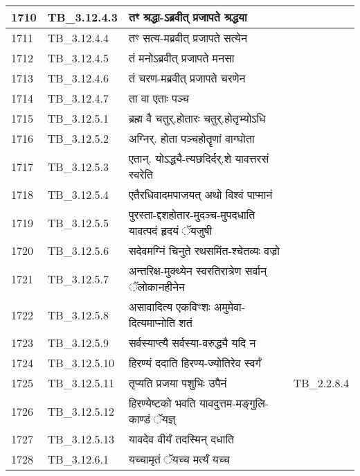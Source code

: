\documentclass[17pt]{extarticle}
\begin{document}
\begin{longtable}{||p{0.4in}||p{0.9in}||p{4.0in}||p{0.9in}||}
        \hline
            1710 & TB\_3.12.4.3 & तꣳ श्रद्धा{-}ऽब्रवीत् प्रजापते श्रद्धया &      \\
        \hline
            1711 & TB\_3.12.4.4 & तꣳ सत्य{-}मब्रवीत् प्रजापते सत्येन &      \\
        \hline
            1712 & TB\_3.12.4.5 & तं मनोऽब्रवीत् प्रजापते मनसा &      \\
        \hline
            1713 & TB\_3.12.4.6 & तं चरण{-}मब्रवीत् प्रजापते चरणेन &      \\
        \hline
            1714 & TB\_3.12.4.7 & ता वा एताः पञ्च &      \\
        \hline
            1715 & TB\_3.12.5.1 & ब्रह्म वै चतुर्.होतारः चतुर्.होतृभ्योऽधि &      \\
        \hline
            1716 & TB\_3.12.5.2 & अग्निर्. होता पञ्चहोतॄणां वाग्घोता &      \\
        \hline
            1717 & TB\_3.12.5.3 & एतान्. योऽद्ध्यै{-}त्यछदिर्दर्.शे यावत्तरसं स्वरेति &      \\
        \hline
            1718 & TB\_3.12.5.4 & एतैरधिवादमपाजयत् अथो विश्वं पाप्मानं &      \\
        \hline
            1719 & TB\_3.12.5.5 & पुरस्ता{-}द्दशहोतार{-}मुदञ्च{-}मुपदधाति यावत्पदं हृदयं ॅयजुषी &      \\
        \hline
            1720 & TB\_3.12.5.6 & सदेवमग्निं चिनुते रथसमिंत{-}श्चेतव्यः वज्रो &      \\
        \hline
            1721 & TB\_3.12.5.7 & अन्तरिक्ष{-}मुक्थ्येन स्वरतिरात्रेण सर्वान् ॅलोकानहीनेन &      \\
        \hline
            1722 & TB\_3.12.5.8 & असावादित्य एकविꣳशः अमुमेवा{-}दित्यमाप्नोति शतं &      \\
        \hline
            1723 & TB\_3.12.5.9 & सर्वस्याप्त्यै सर्वस्या{-}वरुद्ध्यै यदि न &      \\
        \hline
            1724 & TB\_3.12.5.10 & हिरण्यं ददाति हिरण्य{-}ज्योतिरेव स्वर्गं &      \\
        \hline
            1725 & TB\_3.12.5.11 & तृप्यति प्रजया पशुभिः उपैनं & TB\_2.2.8.4        \\
        \hline
            1726 & TB\_3.12.5.12 & हिरण्येष्टको भवति यावदुत्तम{-}मङ्गुलि{-}काण्डं ॅयज्ञ् &      \\
        \hline
            1727 & TB\_3.12.5.13 & यावदेव वीर्यं तदस्मिन् दधाति &      \\
        \hline
            1728 & TB\_3.12.6.1 & यच्चामृतं ॅयच्च मर्त्यं यच्च &      \\

\end{longtable}
\end{document}
